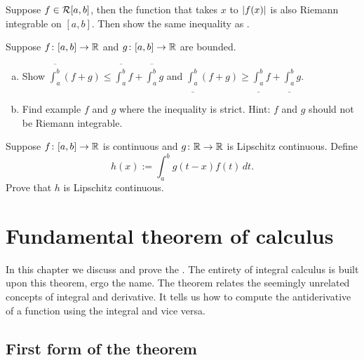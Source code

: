 \begin{exercise}[Challenging] \label{exercise:hardabsint}
Suppose $f \in {\mathcal{R}}[a,b]$, then the function that takes $x$ to
$\left\lvert {f(x)} \right\rvert$ is also Riemann integrable on $[a,b]$.
Then show the same inequality as .
\end{exercise}

\begin{exercise}  \label{exercise:upperlowerlinineq}
Suppose $f \colon [a,b] \to {\mathbb{R}}$ and $g \colon [a,b] \to {\mathbb{R}}$
are bounded.
\begin{enumerate}[a)]
\item
Show
$\overline{\int_a^b} (f+g) \leq \overline{\int_a^b}f+\overline{\int_a^b}g$ and
$\underline{\int_a^b} (f+g) \geq
\underline{\int_a^b}f+\underline{\int_a^b}g$.
\item
Find example $f$ and $g$ where
the inequality is strict.  Hint: $f$ and $g$ should not be Riemann
integrable.
\end{enumerate}
\end{exercise}

\begin{exercise}
Suppose $f \colon [a,b] \to {\mathbb{R}}$ is continuous and $g \colon {\mathbb{R}} \to {\mathbb{R}}$ is
Lipschitz continuous.  Define
\begin{equation*}
h(x) := \int_a^b g(t-x) f(t) \, dt .
\end{equation*}
Prove that $h$ is Lipschitz continuous.
\end{exercise}


\sectionnewpage
\section{Fundamental theorem of calculus}
\label{sec:ftc}


In this chapter we discuss and prove the
\emph{}.
The entirety of integral calculus is built upon this theorem,
ergo the name.
The theorem relates the seemingly unrelated concepts of integral and
derivative.  It tells us how to compute the antiderivative of a function
using the integral and vice versa.

\subsection{First form of the theorem}

